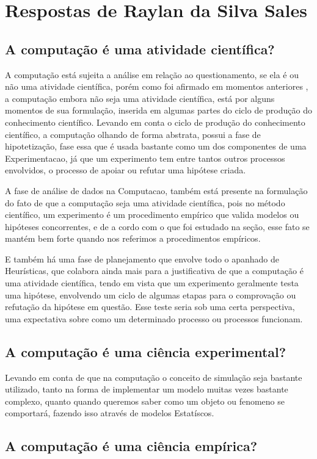 \section{Respostas de Raylan da Silva Sales}

\subsection{A computação é uma atividade científica?}

A computação está sujeita a análise em relação ao questionamento, se ela é ou não uma atividade científica, porém como foi afirmado em momentos anteriores \cite{fernandes_consideracoes_2021}, a computação embora não seja uma atividade científica, está por alguns momentos de sua formulação, inserida em algumas partes do ciclo de produção do conhecimento científico. Levando em conta o ciclo de produção do conhecimento científico, a computação olhando de forma abstrata, possui a fase de hipotetização, fase essa que é usada bastante como um dos componentes de uma \gls{Experimentacao}, já que um experimento tem entre tantos outros processos envolvidos, o processo de apoiar ou refutar uma hipótese criada.

A fase de análise de dados na \gls{Computacao}, também está presente na formulação do fato de que a computação seja uma atividade científica, pois no método científico, um experimento é um procedimento empírico que valida modelos ou hipóteses concorrentes, e de a cordo com o que foi estudado na seção, esse fato se mantém bem forte quando nos referimos a procedimentos empíricos.

E também há uma fase de planejamento que envolve todo o apanhado de \gls{Heurísticas}, que colabora ainda mais para a justificativa de que a computação é uma atividade científica, tendo em vista que um experimento geralmente testa uma hipótese, envolvendo um ciclo de algumas etapas para o comprovação ou refutação da hipótese em questão. Esse teste seria sob uma certa perspectiva, uma expectativa sobre como um determinado processo ou processos funcionam. 

\subsection{A computação é uma ciência experimental?}

Levando em conta de que na computação o conceito de simulação seja bastante utilizado, tanto na forma de implementar um modelo muitas vezes bastante complexo, quanto quando queremos saber como um objeto ou \gls{fenomeno} se comportará, fazendo isso através de modelos \gls{Estatíscos}.

\subsection{A computação é uma ciência empírica?}
